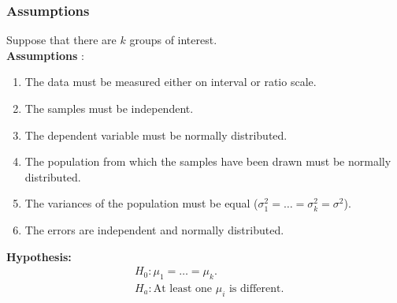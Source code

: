 \begin{frame}[noframenumbering]
\frametitle{Assumptions}
Suppose that there are $k$ groups of interest.\\
\vspace{3mm}
\textbf{Assumptions} \citep{verma2013one}:
    \begin{enumerate}
        \item The data must be measured either on interval or ratio scale.
        \item The samples must be {\color{red}independent}.
        \item The dependent variable must be {\color{red}normally distributed}.
        \item The population from which the samples have been drawn must be {\color{red}normally distributed}.
        \item The variances of the population must be equal {\color{red}($\sigma_{1}^{2}=\dots=\sigma_{k}^{2}=\sigma^{2}$).}
        \item The errors are independent and normally distributed.
    \end{enumerate}
    \vspace{3mm}
    \textbf{Hypothesis:}
    \begin{equation*}\begin{split}
        &H_{0}: \mu_{1}=\dots=\mu_{k}. \\
        &H_{a}: \text{At least one $\mu_{i}$ is different.}
    \end{split}
    \end{equation*}
\end{frame}


